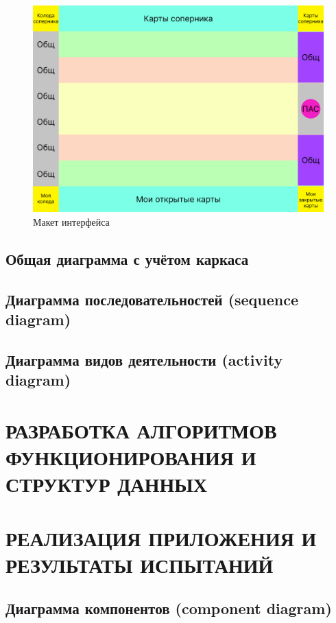 \documentclass[12pt, a4paper, simple]{eskdtext}
\begin{document}
    \begin{figure}[!h]
        \centering
        \includegraphics[width=16cm]
            {../sources/game_ux/build/game_ux.png}
        \caption{Макет интерфейса}
    \end{figure}

    \subsection{Общая диаграмма с учётом каркаса}
    \subsection{Диаграмма последовательностей (sequence diagram)}
    \subsection{Диаграмма видов деятельности (activity diagram)}
    \newpage
    
    \section{РАЗРАБОТКА АЛГОРИТМОВ ФУНКЦИОНИРОВАНИЯ И СТРУКТУР ДАННЫХ}
    \newpage
    
    \section{РЕАЛИЗАЦИЯ ПРИЛОЖЕНИЯ И РЕЗУЛЬТАТЫ ИСПЫТАНИЙ}
    \subsection{Диаграмма компонентов (component diagram)}
\end{document}
